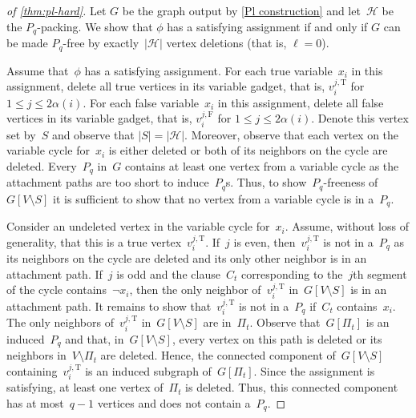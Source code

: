 \documentclass[envcountsame,numbook,smallextended]{svjour3}
\numberwithin{equation}{section}
\numberwithin{figure}{section}
\newcommand{\occ}{\ensuremath{\alpha}}
\newcommand{\packing}{\ensuremath{\mathcal H}}
\begin{document}
\begin{proof}[of \cref{thm:pl-hard}]
  Let $G$ be the graph output by \cref{Pl construction} and let~$\packing$ be
  the $P_q$-packing.
We show that $\phi$ has a satisfying assignment if and only if $G$ can be made
  $P_q$-free by exactly~$|\packing|$ vertex deletions (that is, $\ell=0$).

  Assume that~$\phi$ has a satisfying assignment.
  For each true variable~$x_i$ in this assignment,
  delete all true vertices in its variable gadget,
  that is, $v_i^{j,\text{T}}$ for $1\le j\le 2\occ(i)$.
  For each false variable~$x_i$ in this assignment,
  delete all false vertices in its variable gadget,
  that is, $v_i^{j,\text{F}}$ for $1\le j\le 2\occ(i)$.
  Denote this vertex set by~$S$ and observe that $|S|=|\packing|$.
  Moreover,
  observe that each vertex on the variable cycle for~$x_i$
  is either deleted
  or both of its neighbors on the cycle are deleted.
  Every~$P_q$ in~$G$
  contains at least one vertex from a variable cycle
  as the attachment paths are too short to induce~$P_q$s. Thus, to show~$P_q$-freeness of~$G[V\setminus S]$ it is sufficient to show that no vertex from a variable cycle is in a~$P_q$.

  Consider an undeleted vertex in the variable cycle for~$x_i$.
  Assume, without loss of generality,
  that this is a true vertex~$v_i^{j,\text{T}}$.
  If~$j$ is even, then~$v_i^{j,\text{T}}$ is not in a~$P_q$
  as its neighbors on the cycle are deleted
  and its only other neighbor is in an attachment path.
  If~$j$ is odd and the
  clause~$C_t$ corresponding to the~$j$th segment of the cycle
  contains~$\neg x_i$, then the only neighbor of~$v_i^{j,\text{T}}$ in~$G[V\setminus S]$
  is in an attachment path. It remains to show that~$v_i^{j,\text{T}}$ is not
  in a~$P_q$ if~$C_t$ contains~$x_i$. The only neighbors
  of~$v_i^{j,\text{T}}$ in~$G[V\setminus S]$ are in~$\Pi_t$.
  Observe that~$G[\Pi_t]$ is an induced~$P_q$
  and that,
  in~$G[V\setminus S]$,
  every vertex on this path is deleted
  or its neighbors in~$V\setminus \Pi_t$ are deleted.
  Hence, the connected
  component of~\(G[V\setminus S]\) containing~$v_i^{j,\text{T}}$
  is an induced subgraph
  of~$G[\Pi_t]$. Since the assignment is satisfying, at least one
  vertex of~$\Pi_t$ is deleted. Thus, this connected component has at
  most~$q-1$ vertices and does not contain a~$P_q$.
 

\end{proof}
\end{document}
